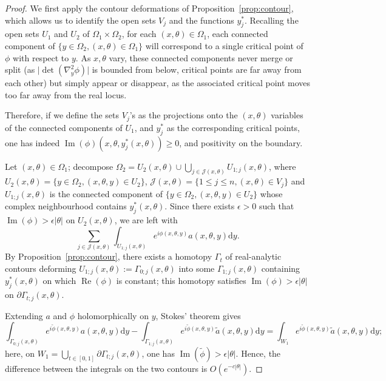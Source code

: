 \documentclass[10pt]{amsart}
\theoremstyle{definition}\newtheorem{defi}[theo]{Definition}\newtheorem{rema}[theo]{Remark}\newtheorem{exam}[theo]{Example}\newtheorem{exem}[theo]{Example}\newtheorem{nota}[theo]{Notation}
\DeclareMathOperator{\re}{Re}
\DeclareMathOperator{\im}{Im}
\newcommand{\clJ}{\mathcal{J}}
\newcommand\1{\mathds{1}}
\newcommand{\dd}{\mathrm{d}}
\begin{document}
\begin{proof}
We first apply the contour deformations of Proposition~\ref{prop:contour}, which allows us to identify the open sets $V_j$ and the functions $y^*_j$. Recalling the open sets $U_1$ and $U_2$ of $\Omega_1\times \Omega_2$, for each $(x,\theta)\in \Omega_1$, each connected component of $\{y\in \Omega_2,(x,\theta)\in \Omega_1\}$ will correspond to a single critical point of $\phi$ with respect to $y$. As $x,\theta$ vary, these connected components never merge or split (as $\lvert\det(\nabla^2_y\phi)|$ is bounded from below, critical points are far away from each other) but simply appear or disappear, as the associated critical point moves too far away from the real locus.

Therefore, if we define the sets $V_j$'s as the projections onto the $(x,\theta)$ variables of the connected components of $U_1$, and $y^*_j$ as the corresponding critical points, one has indeed $\im(\phi)(x,\theta,y_j^*(x,\theta))\geq 0$, and positivity on the boundary.

Let $(x,\theta)\in \Omega_1$; decompose $\Omega_2=U_2(x,\theta)\cup
\bigcup_{j\in \clJ(x,\theta)}U_{1;j}(x,\theta)$, where $U_2(x,\theta)=\{y\in \Omega_2,(x,\theta,y)\in U_2\}$, $\clJ(x,\theta)=\{1\leq j\leq n, (x,\theta)\in V_j\}$ and $U_{1;j}(x,\theta)$ is the connected component of $\{y\in
\Omega_2,(x,\theta,y)\in U_2\}$ whose complex neighbourhood contains $y_j^*(x,\theta)$. Since there exists $\epsilon>0$ such that $\im(\phi)>\epsilon|\theta|$ on $U_2(x,\theta)$, we are left with
\[
\sum_{j\in
\clJ(x,\theta)}\int_{U_{1;j}(x,\theta)}e^{i\phi(x,\theta,y)}a(x,\theta,y)\dd y.
\]
By Proposition~\ref{prop:contour}, there exists a homotopy $\Gamma_t$ of real-analytic contours deforming $U_{1;j}(x,\theta):=\Gamma_{0;j}(x,\theta)$ into some $\Gamma_{1;j}(x,\theta)$ containing $y^*_j(x,\theta)$ on which $\re(\phi)$ is constant; this homotopy satisfies $\im(\phi)>\epsilon|\theta|$ on $\partial
\Gamma_{t;j}(x,\theta)$.

Extending $a$ and $\phi$ holomorphically on $y$, Stokes' theorem gives
\[
\int_{\Gamma_{0;j}(x,\theta)}e^{i\widetilde{\phi}(x,\theta,y)}a(x,\theta,y)\dd y -
\int_{\Gamma_{1;j}(x,\theta)}e^{i\widetilde{\phi}(x,\theta,y)}\widetilde{a}(x,\theta,y)\dd y=\int_{W_1}e^{i\widetilde{\phi}(x,\theta,y)}\widetilde{a}(x,\theta,y)\dd y;
\]
here, on $W_1=\bigcup_{t\in [0,1]}\partial \Gamma_{t;j}(x,\theta)$, one has $\im(\widetilde{\phi})>\epsilon |\theta|$. Hence, the difference between the integrals on the two contours is $O(e^{-c|\theta|})$.


\end{proof}
\end{document}
